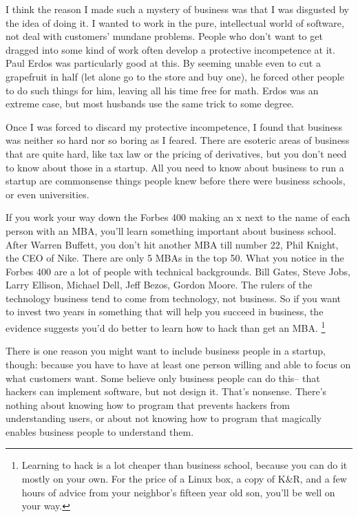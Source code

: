 \documentclass[12pt]{book}
\begin{document}
I think the reason I made such a mystery of business was that I was
disgusted by the idea of doing it. I wanted to work in the pure,
intellectual world of software, not deal with customers' mundane
problems. People who don't want to get dragged into some kind of work
often develop a protective incompetence at it. Paul Erdos was
particularly good at this. By seeming unable even to cut a grapefruit in
half (let alone go to the store and buy one), he forced other people to
do such things for him, leaving all his time free for math. Erdos was an
extreme case, but most husbands use the same trick to some degree.

Once I was forced to discard my protective incompetence, I found that
business was neither so hard nor so boring as I feared. There are
esoteric areas of business that are quite hard, like tax law or the
pricing of derivatives, but you don't need to know about those in a
startup. All you need to know about business to run a startup are
commonsense things people knew before there were business schools, or
even universities.

If you work your way down the Forbes 400 making an x next to the name of
each person with an MBA, you'll learn something important about business
school. After Warren Buffett, you don't hit another MBA till number 22,
Phil Knight, the CEO of Nike. There are only 5 MBAs in the top 50. What
you notice in the Forbes 400 are a lot of people with technical
backgrounds. Bill Gates, Steve Jobs, Larry Ellison, Michael Dell, Jeff
Bezos, Gordon Moore. The rulers of the technology business tend to come
from technology, not business. So if you want to invest two years in
something that will help you succeed in business, the evidence suggests
you'd do better to learn how to hack than get an MBA. \footnote{Learning to hack is a lot cheaper than business school, because
you can do it mostly on your own. For the price of a Linux box, a copy
of K\&R, and a few hours of advice from your neighbor's fifteen year old
son, you'll be well on your way.}

There is one reason you might want to include business people in a
startup, though: because you have to have at least one person willing
and able to focus on what customers want. Some believe only business
people can do this-- that hackers can implement software, but not design
it. That's nonsense. There's nothing about knowing how to program that
prevents hackers from understanding users, or about not knowing how to
program that magically enables business people to understand them.
\end{document}
